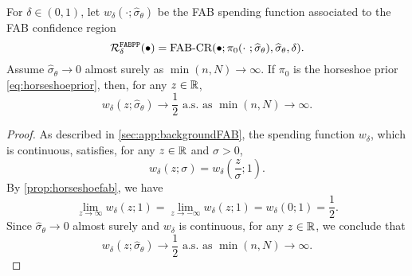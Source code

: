 \begin{lemma}
    \label{lemma:coverage_horseshoe_delta1}
    For $\delta\in(0,1)$, let $w_\delta(\cdot; \widehat{\sigma}_\theta)$ be the FAB spending function associated to the FAB confidence region $$\mathcal R^{\mathrm{\texttt{FABPP}}}_\delta(\bullet)=\text{FAB-CR}(\bullet;\pi_0(\cdot~;\widehat\sigma_\theta ),\widehat\sigma_\theta,\delta).$$
    Assume $\widehat{\sigma}_\theta\to 0$ almost surely as $\min(n,N)\to\infty$. If $\pi_0$ is the horseshoe prior \eqref{eq:horseshoeprior}, then, for any $z\in\mathbb R$,
    \begin{equation*}
        w_\delta(z; \widehat{\sigma}_\theta)\to\frac{1}{2}\text{ a.s. as }\min(n,N)\to\infty.
    \end{equation*}
\end{lemma}
\begin{proof}
    As described in \cref{sec:app:backgroundFAB}, the spending function $w_\delta$, which is continuous, satisfies,  for any $z\in\mathbb R$ and $\sigma>0$,
    \begin{equation*}
        w_\delta\left(z; \sigma \right) = w_\delta\left(\frac{z}{\sigma}; 1\right).
    \end{equation*}
    By \cref{prop:horseshoefab}, we have
    $$
        \lim_{z\to\infty} w_\delta(z;1)=\lim_{z\to -\infty} w_\delta(z;1)=w_\delta(0;1)=\frac{1}{2}.
    $$
    Since $\widehat{\sigma}_\theta\to 0$ almost surely and $w_\delta$ is continuous, for any $z\in\mathbb R$, we conclude that
    \begin{equation*}
    w_\delta\left(z; \widehat{\sigma}_\theta \right)  \to\frac{1}{2}\text{ a.s. as }\min(n,N)\to\infty.
    \end{equation*}
\end{proof}

